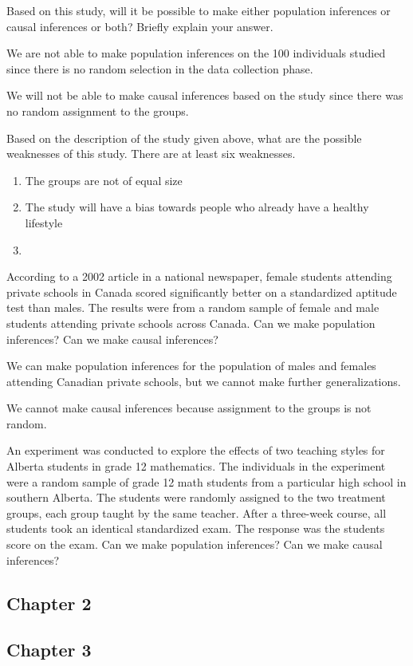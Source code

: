 \documentclass{article}
\theoremstyle{plain}
\theoremstyle{definition}
\theoremstyle{definition}
\begin{document}
\begin{question}
    Based on this study, will it be possible to make either population inferences or causal inferences or
    both? Briefly explain your answer.
\end{question}
\begin{answer}%
    We are not able to make population inferences on the 100 individuals studied since there is no random selection in the data collection phase.
    
    We will not be able to make causal inferences based on the study since there was no random assignment to the groups.
\end{answer}

\begin{question}
    Based on the description of the study given above, what are the possible weaknesses of this study.
    There are at least six weaknesses.
\end{question}
\begin{answer}%
    \begin{enumerate}
        \item The groups are not of equal size
        \item The study will have a bias towards people who already have a healthy lifestyle
        \item 
    \end{enumerate}
\end{answer}

\begin{question}
    According to a 2002 article in a national newspaper, female students attending private schools in Canada
    scored significantly better on a standardized aptitude test than males. The results were from a random
    sample of female and male students attending private schools across Canada. Can we make population
    inferences? Can we make causal inferences?
\end{question}
\begin{answer}
    We can make population inferences for the population of males and females attending Canadian private schools, but we cannot make further generalizations.
    
    We cannot make causal inferences because assignment to the groups is not random.
\end{answer}

\begin{question}
    An experiment was conducted to explore the effects of two teaching styles for Alberta students in grade
    12 mathematics. The individuals in the experiment were a random sample of grade 12 math students
    from a particular high school in southern Alberta. The students were randomly assigned to the two
    treatment groups, each group taught by the same teacher. After a three-week course, all students took
    an identical standardized exam. The response was the students score on the exam. Can we make
    population inferences? Can we make causal inferences?
\end{question}
\subsection{Chapter 2}
\subsection{Chapter 3}
\end{document}
